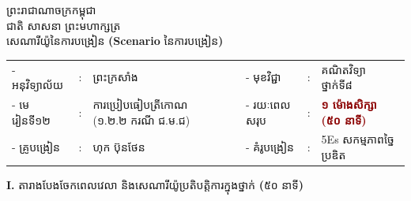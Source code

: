 \documentclass[a4paper,10pt]{article}
\newcommand{\enbf}[1]{{\TimesEn\textbf{#1}}}
\begin{document}
\fontsize{9.8pt}{14.6pt}\selectfont

\begin{center}
  {\muol\fontsize{11pt}{16pt}\selectfont ព្រះរាជាណាចក្រកម្ពុជា}\\[1pt]
  {\muol\fontsize{10pt}{15pt}\selectfont ជាតិ សាសនា ព្រះមហាក្សត្រ}\\[4pt]
  {\muol\fontsize{10.5pt}{15pt}\selectfont សេណារីយ៉ូនៃការបង្រៀន \enbf{(Scenario} នៃការបង្រៀន\enbf{)}}
\end{center}

\vspace{2pt}
{\renewcommand{\arraystretch}{1.08}
\begin{tabular}{@{}l l l p{1.0cm} l l l@{}}
  - អនុវិទ្យាល័យ & : & ព្រះក្រសាំង & & - មុខវិជ្ជា & : & គណិតវិទ្យា ថ្នាក់ទី៨ \\
  - មេរៀនទី១២ & : & ការប្រៀបធៀបត្រីកោណ (១.២.២ ករណី ជ.ម.ជ) & & - រយៈពេលសរុប & : & \textcolor{darkred}{\textbf{១ ម៉ោងសិក្សា (៥០ នាទី)}} \\
  - គ្រូបង្រៀន & : & ហុក ប៊ុនថែន & & - គំរូបង្រៀន & : & 5Es សកម្មភាពច្នៃប្រឌិត \\
\end{tabular}
}

\vspace{4pt}

\textbf{I.} {\muol តារាងបែងចែកពេលវេលា និងសេណារីយ៉ូប្រតិបត្តិការក្នុងថ្នាក់ \enbf{(}៥០ នាទី\enbf{)}}
\end{document}
